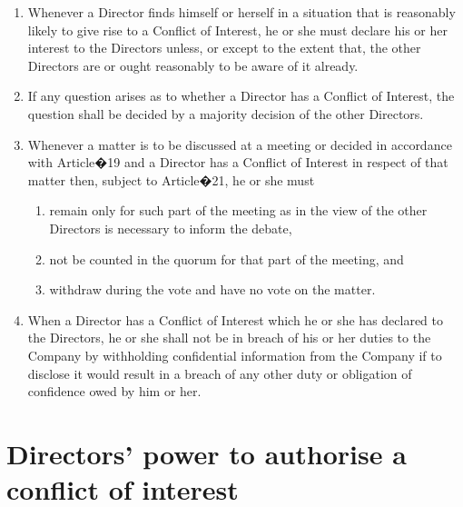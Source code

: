 \documentclass[a4paper,12pt]{article}
\begin{document}
\begin{enumerate}
  \item Whenever a Director finds himself or herself in a situation that is reasonably likely to give rise to a Conflict of Interest, he or she must declare his or her interest to the Directors unless, or except to the extent that, the other Directors are or ought reasonably to be aware of it already.
  \item If any question arises as to whether a Director has a Conflict of Interest, the question shall be decided by a majority decision of the other Directors.
  \item Whenever a matter is to be discussed at a meeting or decided in accordance with Article�19 and a Director has a Conflict of Interest in respect of that matter then, subject to Article�21, he or she must
  \begin{enumerate}
    \item remain only for such part of the meeting as in the view of the other Directors is necessary to inform the debate,
    \item not be counted in the quorum for that part of the meeting, and
    \item withdraw during the vote and have no vote on the matter.
  \end{enumerate}
  \item	When a Director has a Conflict of Interest which he or she has declared to the Directors, he or she shall not be in breach of his or her duties to the Company by withholding confidential information from the Company if to disclose it would result in a breach of any other duty or obligation of confidence owed by him or her.
\end{enumerate}

\section{Directors' power to authorise a conflict of interest}
\end{document}

